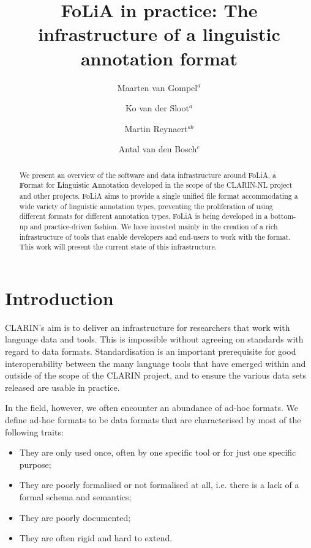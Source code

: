 \documentclass[a4paper,11pt]{article}
\begin{document}
\title{FoLiA in practice: The infrastructure of a linguistic annotation format}
\author{Maarten van Gompel$^a$ \and Ko van der
    Sloot$^a$ \and Martin Reynaert$^{ab}$ \and Antal van den Bosch$^c$} %
\date{}


\maketitle
\renewcommand{\thefootnote}{\alph{footnote}}
\renewcommand{\thefootnote}{\arabic{footnote}}

\begin{abstract}
We present an overview of the software and data infrastructure around FoLiA, a
\textbf{Fo}rmat for \textbf{Li}nguistic \textbf{A}nnotation developed in the
scope of the CLARIN-NL project and other projects.  FoLiA aims to provide a
single unified file format accommodating a wide variety of linguistic
annotation types, preventing the proliferation of using different formats for
different annotation types. FoLiA is being developed in a bottom-up and
practice-driven fashion.  We have invested mainly in the creation of a rich
infrastructure of tools that enable developers and end-users to work with the
format. This work will present the current state of this infrastructure.
\end{abstract}


\section{Introduction}

CLARIN's aim is to deliver an infrastructure for researchers that work with
language data and tools. This is impossible without agreeing on standards with
regard to data formats. Standardisation is an important prerequisite for good
interoperability between the many language tools that have emerged within and
outside of the scope of the CLARIN project, and to ensure the various data sets
released are usable in practice.

In the field, however, we often encounter an abundance of ad-hoc formats. We
define ad-hoc formats to be data formats that are characterised by most of the
following traits:

\begin{itemize}
    \item They are only used once, often by one specific tool or for just one specific purpose;
    \item They are poorly formalised or not formalised at all, i.e. there is a lack of a formal schema and semantics;
    \item They are poorly documented;
    \item They are often rigid and hard to extend.
\end{itemize}
\end{document}
